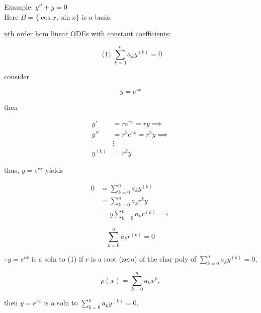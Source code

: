\begin{example}
  Example: \( y'' + y = 0 \) \\ 

  Here \( B = \{ \cos x, \sin x \} \) is a basis.
\end{example}

\underline{nth order hom linear ODEs with constant coefficients:}

\[ \text{ (1) } \sum_{k=0}^n a_ky^{(k)} = 0 \]

consider 

\[ y = e^{rx} \]

then 

\begin{align*}
  y'      & = re^{rx} = ry \implies \\
  y''     & = r^2e^{rx} = r^2y \implies \\
  & \vdots \\
  y^{(k)} & = r^ky
\end{align*}

thus, \( y = e^{rx} \) yields 

\begin{align*}
  0 & = \sum_{k=0}^n a_ky^{(k)} \\
  & = \sum_{k=0}^n a_kr^ky \\
  & = y\sum_{k=0}^n a_kr^{(k)}  \implies
\end{align*}

\[ \sum_{k=0}^n a_kr^{(k)} = 0 \]

\( \therefore y = e^{rx} \) is a soln to (1) if \( r \) is a root (zero)
of the char poly of \( \sum_{k=0}^n a_ky^{(k)} = 0 \), 

\hrulefill

\[ \rho (x) = \sum_{k=0}^n a_kx^k,\]

then \( y = e^{rx} \) is a soln to \( \sum_{k=0}^n a_ky^{(k)} = 0 \). 

